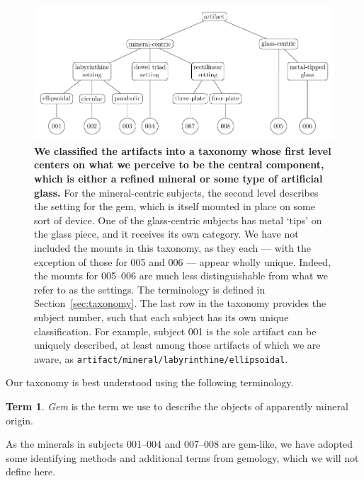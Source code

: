 \documentclass[10pt]{article}
\theoremstyle{definition}
\newtheorem{term}{Term}
\begin{document}
\begin{figure}
\includegraphics[width=1.0\textwidth]{taxonomy.pdf}
\caption{\label{fig:taxonomy}\textbf{We classified the artifacts into a taxonomy whose first level centers on what we perceive to be the central component, which is either a refined mineral or some type of artificial glass.} For the mineral-centric subjects, the second level describes the setting for the gem, which is itself mounted in place on some sort of device. One of the glass-centric subjects has metal `tips' on the glass piece, and it receives its own category. We have not included the mounts in this taxonomy, as they each --- with the exception of those for 005 and 006 --- appear wholly unique. Indeed, the mounts for 005--006 are much less distinguishable from what we refer to as the settings. The terminology is defined in Section~\ref{sec:taxonomy}. The last row in the taxonomy provides the subject number, such that each subject has its own unique classification. For example, subject 001 is the sole artifact can be uniquely described, at least among those artifacts of which we are aware, as \texttt{artifact/mineral/labyrinthine/ellipsoidal}. }
\end{figure}

Our taxonomy is best understood using the following terminology.

\begin{term}
\emph{Gem} is the term we use to describe the objects of apparently mineral origin.
\end{term}
As the minerals in subjects 001--004 and 007--008 are gem-like, we have adopted some identifying methods and additional terms from gemology, which we will not define here.
\end{document}
